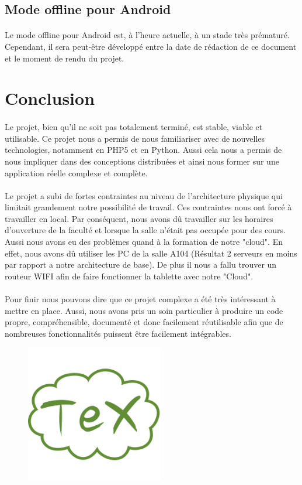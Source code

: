 \documentclass[a4paper,12pt]{article}
\begin{document}
\subsection{Mode offline pour Android}
\paragraph*{}
Le mode offline pour Android est, à l'heure actuelle, à un stade très prématuré. Cependant, il sera peut-être développé entre la date de rédaction de ce document et le moment de rendu du projet.
\newpage

\section{Conclusion}
\paragraph*{}

Le projet, bien qu'il ne soit pas totalement terminé, est stable, viable et utilisable. Ce projet nous a permis de nous familiariser avec de nouvelles technologies, notamment en PHP5 et en Python. Aussi cela nous a permis de nous impliquer dans des conceptions distribuées et ainsi nous former sur une application réelle complexe et complète.

\paragraph*{}
Le projet a subi de fortes contraintes au niveau de l'architecture physique qui limitait grandement notre possibilité de travail. Ces contraintes nous ont forcé à travailler en local. Par conséquent, nous avons dû travailler sur les horaires d'ouverture de la faculté et lorsque la salle n'était pas occupée pour des cours. Aussi nous avons eu des problèmes quand à la formation de notre "cloud". En effet, nous avons dû utiliser les PC de la salle A104 (Résultat 2 serveurs en moins par rapport a notre architecture de base). De plus il nous a fallu trouver un routeur WIFI afin de faire fonctionner la tablette avec notre "Cloud".

\paragraph*{}
Pour finir nous pouvons dire que ce projet complexe a été très intéressant à mettre en place. Aussi, nous avons pris un soin particulier à produire un code propre, compréhensible, documenté et donc facilement réutilisable afin que de nombreuses fonctionnalités puissent être facilement intégrables. 

\bigskip
\bigskip
\begin{figure}[!ht]
\begin{center}
  \includegraphics[width=6cm]{./images/logoTexloud.png}
\end{center}
\end{figure}
\newpage
\listoffigures
\end{document}
